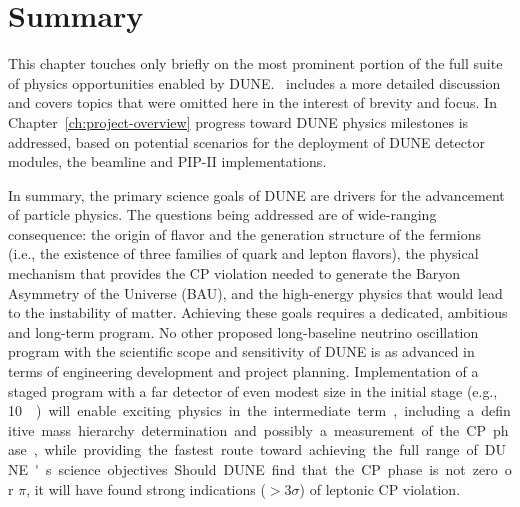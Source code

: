 
%
\section{Summary}


This chapter %
touches only briefly on the most prominent portion of
the full suite of physics opportunities enabled by DUNE.  
\volphys ~includes a more detailed discussion and covers topics %
that were omitted here in the interest of brevity and focus.  In
Chapter~\ref{ch:project-overview} progress toward DUNE physics milestones is
addressed, based on potential scenarios for the deployment of DUNE
detector modules, the beamline and PIP-II implementations. 

In summary, the primary science goals of DUNE are drivers for the
advancement of particle physics. The questions being addressed are of
wide-ranging consequence: the origin of flavor and the generation
structure of the fermions (i.e., the existence of three families of
quark and lepton flavors), the physical mechanism that provides the CP
violation needed to generate the Baryon Asymmetry of the Universe
(BAU), and the high-energy physics that would lead to the instability
of matter.  Achieving these goals requires a dedicated, ambitious and
long-term program.  No other proposed long-baseline neutrino
oscillation program with the scientific scope and sensitivity of DUNE
is as advanced in terms of engineering development and project
planning.  Implementation of a staged program with a far detector of
even modest size in the initial stage (e.g., \SI{10}\kt) will enable
exciting physics in the intermediate term, including a definitive mass
hierarchy determination and possibly a measurement of the CP phase, 
while providing the fastest route toward achieving the
full range of DUNE's science objectives.  Should DUNE find that the CP
phase is not zero or $\pi$, it will have found strong indications
($>3\sigma$) of leptonic CP violation.

